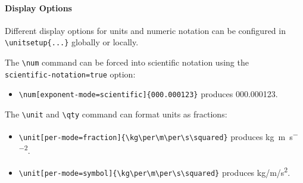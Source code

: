 \paragraph*{Display Options}

Different display options for units and numeric notation can be configured in \\
 \verb|\unitsetup{...}| globally or locally.

The \verb|\num| command can be forced into scientific notation using the\\
\verb|scientific-notation=true| option:

\begin{itemize}
    \item \verb|\num[exponent-mode=scientific]{000.000123}| produces \num[exponent-mode=scientific]{000.000123}.
\end{itemize}

The \verb|\unit| and \verb|\qty| command can format units as fractions:
\begin{itemize}
    \item \verb|\unit[per-mode=fraction]{\kg\per\m\per\s\squared}| produces \unit[per-mode=fraction]{\kg\per\m\per\s\squared}.
    \item \verb|\unit[per-mode=symbol]{\kg\per\m\per\s\squared}| produces \unit[per-mode=symbol]{\kg\per\m\per\s\squared}.
\end{itemize}


















\endgroup